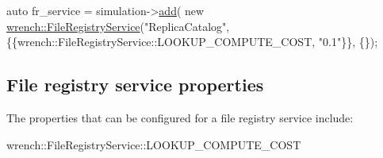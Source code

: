 \begin{DoxyCode}
\textcolor{keyword}{auto} fr\_service = simulation->\hyperlink{classwrench_1_1_simulation_ad1f5c12285ecfaf5a2ce7dab5ec8b4c5}{add}(
          \textcolor{keyword}{new} \hyperlink{classwrench_1_1_file_registry_service}{wrench::FileRegistryService}(\textcolor{stringliteral}{"ReplicaCatalog"},
                                       \{\{wrench::FileRegistryService::LOOKUP\_COMPUTE\_COST, \textcolor{stringliteral}{"0.1"}\}\},
                                       \{\});
\end{DoxyCode}
\hypertarget{guide-fileregistry_guide-fileregistry-creating-properties}{}\subsection{File registry service properties}\label{guide-fileregistry_guide-fileregistry-creating-properties}
The properties that can be configured for a file registry service include\+:


\begin{DoxyItemize}
\item {\ttfamily wrench\+::\+File\+Registry\+Service\+::\+L\+O\+O\+K\+U\+P\+\_\+\+C\+O\+M\+P\+U\+T\+E\+\_\+\+C\+O\+ST} 
\end{DoxyItemize}
